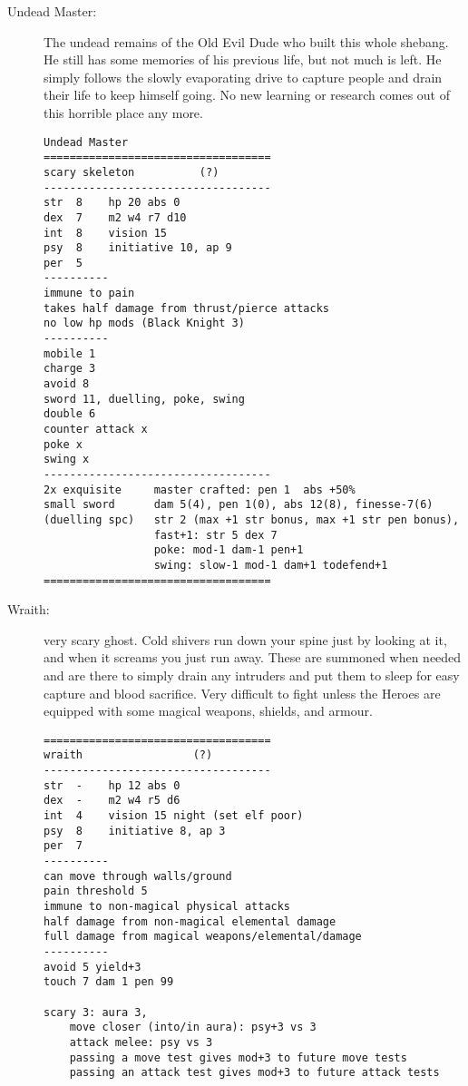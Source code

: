 \begin{description}
\item[Undead Master:] The undead remains of the Old Evil Dude who built this whole shebang. He still has some memories of his previous life, but not much is left. He simply follows the slowly evaporating drive to capture people and drain their life to keep himself going. No new learning or research comes out of this horrible place any more.
\goodbreak \begin{samepage} \small \begin{verbatim}
Undead Master
===================================
scary skeleton          (?)
-----------------------------------
str  8    hp 20 abs 0
dex  7    m2 w4 r7 d10
int  8    vision 15
psy  8    initiative 10, ap 9
per  5
----------
immune to pain
takes half damage from thrust/pierce attacks
no low hp mods (Black Knight 3)
----------
mobile 1
charge 3
avoid 8
sword 11, duelling, poke, swing
double 6
counter attack x
poke x
swing x
-----------------------------------
2x exquisite     master crafted: pen 1  abs +50%
small sword      dam 5(4), pen 1(0), abs 12(8), finesse-7(6)
(duelling spc)   str 2 (max +1 str bonus, max +1 str pen bonus),
                 fast+1: str 5 dex 7
                 poke: mod-1 dam-1 pen+1
                 swing: slow-1 mod-1 dam+1 todefend+1
===================================
\end{verbatim} \normalsize \end{samepage}


\item[Wraith:] very scary ghost. Cold shivers run down your spine just by looking at it, and when it screams you just run away. These are summoned when needed and are there to simply drain any intruders and put them to sleep for easy capture and blood sacrifice. Very difficult to fight unless the Heroes are equipped with some magical weapons, shields, and armour.
\goodbreak \begin{samepage} \small \begin{verbatim}
===================================
wraith                 (?)
-----------------------------------
str  -    hp 12 abs 0
dex  -    m2 w4 r5 d6
int  4    vision 15 night (set elf poor)
psy  8    initiative 8, ap 3
per  7
----------
can move through walls/ground
pain threshold 5
immune to non-magical physical attacks
half damage from non-magical elemental damage
full damage from magical weapons/elemental/damage
----------
avoid 5 yield+3
touch 7 dam 1 pen 99

scary 3: aura 3,
    move closer (into/in aura): psy+3 vs 3
    attack melee: psy vs 3
    passing a move test gives mod+3 to future move tests
    passing an attack test gives mod+3 to future attack tests


\end{verbatim}
\end{samepage}
\end{description}
